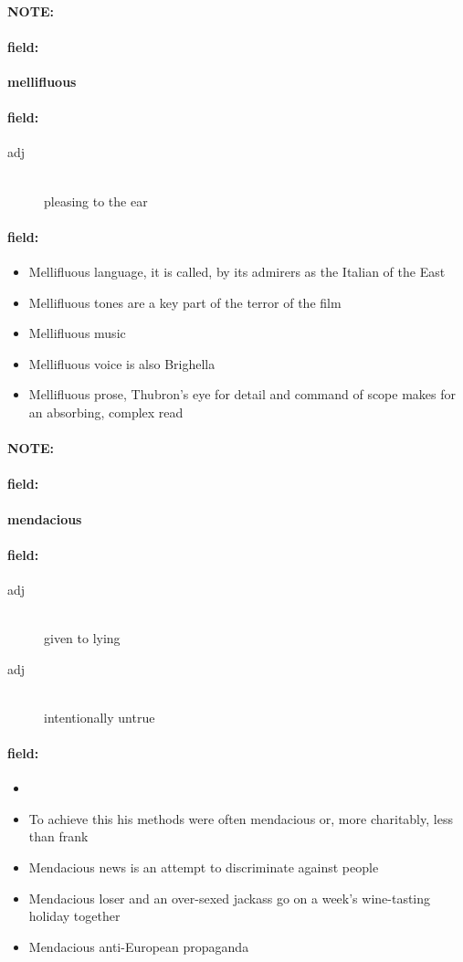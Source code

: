 \documentclass[12pt]{article}
\newenvironment{note}{\paragraph{NOTE:}}{}
\newenvironment{field}{\paragraph{field:}}{}
\begin{document}
\begin{note}
\begin{field}
\textbf{\large mellifluous}
\end{field}


\begin{field}
\begin{description}
\item[adj] \hfill \\ 
pleasing to the ear

\end{description}
\end{field}

\begin{field}
\begin{itemize}
\item Mellifluous language, it is called, by its admirers as the Italian of the East 
\item Mellifluous tones are a key part of the terror of the film
\item Mellifluous music
\item Mellifluous voice is also Brighella
\item Mellifluous prose, Thubron's eye for detail and command of scope makes for an absorbing, complex read
\end{itemize}
\end{field}
\end{note}
\begin{note}
\begin{field}
\textbf{\large mendacious}
\end{field}


\begin{field}
\begin{description}
\item[adj] \hfill \\ 
given to lying

\item[adj] \hfill \\ 
intentionally untrue

\end{description}
\end{field}

\begin{field}
\begin{itemize}
\item 
\item To achieve this his methods were often mendacious or, more charitably, less than frank
\item Mendacious news is an attempt to discriminate against people
\item Mendacious loser and an over-sexed jackass go on a week's wine-tasting holiday together
\item Mendacious anti-European propaganda
\end{itemize}
\end{field}
\end{note}
\end{document}

